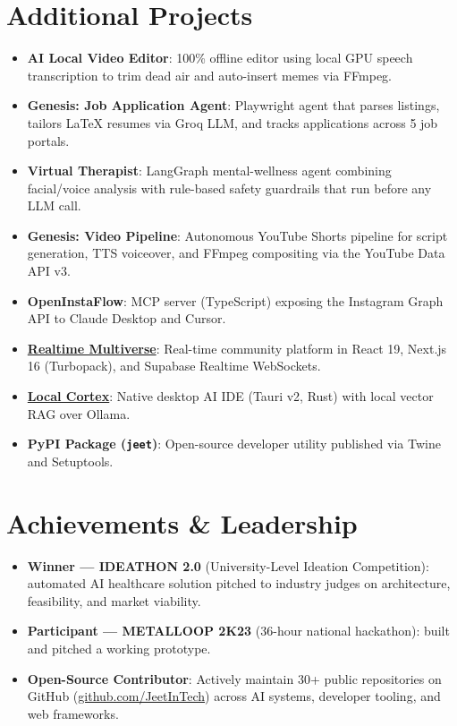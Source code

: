 \documentclass[9.5pt]{article}
\begin{document}
\section*{Additional Projects}
\begin{itemize}
  \item \textbf{AI Local Video Editor}: 100\% offline editor using local GPU speech transcription to trim dead air and auto-insert memes via FFmpeg.
  \item \textbf{Genesis: Job Application Agent}: Playwright agent that parses listings, tailors LaTeX resumes via Groq LLM, and tracks applications across 5 job portals.
  \item \textbf{Virtual Therapist}: LangGraph mental-wellness agent combining facial/voice analysis with rule-based safety guardrails that run before any LLM call.
  \item \textbf{Genesis: Video Pipeline}: Autonomous YouTube Shorts pipeline for script generation, TTS voiceover, and FFmpeg compositing via the YouTube Data API v3.
  \item \textbf{OpenInstaFlow}: MCP server (TypeScript) exposing the Instagram Graph API to Claude Desktop and Cursor.
  \item \textbf{\href{https://github.com/JeetInTech/U---enter-the-multiverse}{Realtime Multiverse}}: Real-time community platform in React 19, Next.js 16 (Turbopack), and Supabase Realtime WebSockets.
  \item \textbf{\href{https://github.com/JeetInTech/Local-Cortex-your-local-chatgpt-with-built-in-editor}{Local Cortex}}: Native desktop AI IDE (Tauri v2, Rust) with local vector RAG over Ollama.
  \item \textbf{PyPI Package (\texttt{jeet})}: Open-source developer utility published via Twine and Setuptools.
\end{itemize}

\section*{Achievements \& Leadership}
\begin{itemize}
  \item \textbf{Winner --- IDEATHON 2.0} (University-Level Ideation Competition): automated AI healthcare solution pitched to industry judges on architecture, feasibility, and market viability.
  \item \textbf{Participant --- METALLOOP 2K23} (36-hour national hackathon): built and pitched a working prototype.
  \item \textbf{Open-Source Contributor}: Actively maintain 30+ public repositories on GitHub (\href{https://github.com/JeetInTech}{github.com/JeetInTech}) across AI systems, developer tooling, and web frameworks.
\end{itemize}
\end{document}
